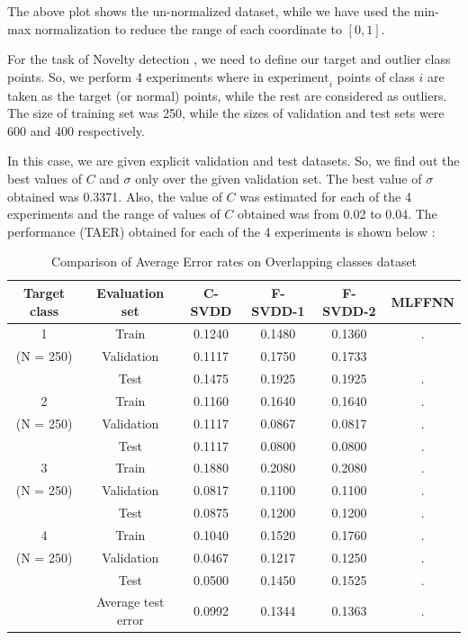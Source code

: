 \documentclass{article} %
\begin{document}
The above plot shows the un-normalized dataset, while we have used the min-max normalization to reduce the  range of each coordinate to $[0,1]$. 

For the task of Novelty detection , we need to define our target and outlier class points. So, we perform 4 experiments where in $\text{experiment}_{i}$ points of class $i$ are taken as the target (or normal) points, while the rest are considered as outliers. The size of training set was 250, while the sizes of validation and test sets were 600 and 400 respectively.

In this case, we are given explicit validation and test datasets. So, we find out the best values of $C$ and $\sigma$ only over the given validation set. The best value of $\sigma$ obtained was 0.3371. Also, the value of $C$ was estimated for each of the 4 experiments and the range of values of $C$ obtained was from 0.02 to 0.04.
The performance (TAER) obtained for each of the 4 experiments is shown below : \\[5pt]
\begin{table}[t]
\begin{center}
\caption{Comparison of Average Error rates on Overlapping classes dataset}
\begin{tabular}{|c|c|c|c|c|c|}
\hline
Target class & Evaluation set & C-SVDD & F-SVDD-1 & F-SVDD-2 & MLFFNN \\ \hline
 1 & Train & 0.1240 & 0.1480 & 0.1360 & . \\ 
 (N = 250) & Validation & 0.1117 & 0.1750 & 0.1733 &  \\ 
 & Test &  0.1475 & 0.1925 &  0.1925 & . \\ \hline
 
 2 & Train & 0.1160 & 0.1640 & 0.1640 & . \\ 
  (N = 250)& Validation &  0.1117  &  0.0867 &  0.0817 & . \\ 
 & Test &  0.1117  &  0.0800 & 0.0800  & . \\ \hline
 
 
 3 & Train & 0.1880 & 0.2080  & 0.2080 & . \\ 
 (N = 250) & Validation & 0.0817 & 0.1100 &  0.1100 & . \\ 
 & Test &  0.0875 &  0.1200 & 0.1200  & . \\ \hline
 
 
 4 & Train & 0.1040 & 0.1520 &  0.1760 & . \\ 
 (N = 250) & Validation &  0.0467 & 0.1217 & 0.1250 & . \\ 
 & Test & 0.0500 &  0.1450 &  0.1525 & . \\ \hline
 
& Average test error  &  0.0992 &  0.1344 & 0.1363 &. \\ \hline

\end{tabular} \\[10pt]
\end{center}

\end{table}
\end{document}
